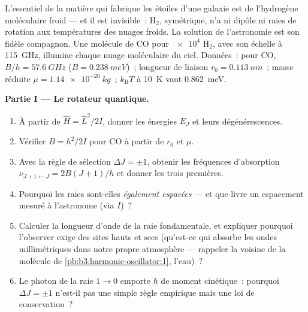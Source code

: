 \begin{problem}\label{pb:b3:quantum-angular-momentum:1}
L'essentiel de la matière qui fabrique les étoiles d'une galaxie est
de l'hydrogène moléculaire froid --- et il est invisible~: H$_2$,
symétrique, n'a ni dipôle ni raies de rotation aux températures des
nuages froids. La solution de l'astronomie est son fidèle compagnon.
Une molécule de CO pour $\num{e4}$ H$_2$, avec son échelle à
\qty{115}{GHz}, illumine chaque nuage moléculaire du ciel. Données~:
pour CO, $B/h = \qty{57.6}{GHz}$ ($B =
\qty{0.238}{meV}$)~; longueur de liaison $r_0 = \qty{0.113}{nm}$~;
masse réduite $\mu = \qty{1.14e-26}{kg}$~; $k_{\text{B}}T$ à
\qty{10}{K} vaut \qty{0.862}{meV}.

\medskip\noindent\textbf{Partie I --- Le rotateur quantique.}
\begin{enumerate}
  \item À partir de $\hat H = \hat L^2/2I$, donner les énergies $E_J$
        et leurs dégénérescences.
  \item Vérifier $B = \hbar^2/2I$ pour CO à partir de $r_0$ et $\mu$.
  \item Avec la règle de sélection $\Delta J = \pm1$, obtenir les
        fréquences d'absorption $\nu_{J+1\leftarrow J} = 2B(J+1)/h$
        et donner les trois premières.
  \item Pourquoi les raies sont-elles \emph{également espacées} ---
        et que livre un espacement mesuré à l'astronome (via $I$)~?
  \item Calculer la longueur d'onde de la raie fondamentale, et
        expliquer pourquoi l'observer exige des sites hauts et secs
        (qu'est-ce qui absorbe les ondes millimétriques dans notre
        propre atmosphère --- rappeler la voisine de la molécule
        de \cref{pb:b3:harmonic-oscillator:1}, l'eau)~?
  \item Le photon de la raie $1 \to 0$ emporte $\hbar$ de moment
        cinétique~: pourquoi $\Delta J = \pm1$ n'est-il pas une simple
        règle empirique mais une loi de conservation~?
\end{enumerate}


\end{problem}
